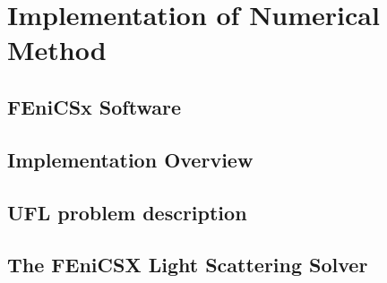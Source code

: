 \chapter{Implementation of Numerical Method}
\label{chap:num_implementation}

\section{FEniCSx Software}

\section{Implementation Overview}

\section{UFL problem description}

\section{The FEniCSX Light Scattering Solver}


